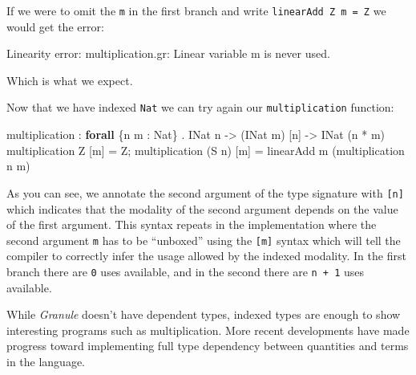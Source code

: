 \documentclass[
]{article}
\newenvironment{Shaded}{}{}
\newcommand{\DataTypeTok}[1]{\textcolor[rgb]{0.56,0.13,0.00}{#1}}
\newcommand{\FunctionTok}[1]{\textcolor[rgb]{0.02,0.16,0.49}{#1}}
\newcommand{\KeywordTok}[1]{\textcolor[rgb]{0.00,0.44,0.13}{\textbf{#1}}}
\newcommand{\NormalTok}[1]{#1}
\newcommand{\OperatorTok}[1]{\textcolor[rgb]{0.40,0.40,0.40}{#1}}
\newcommand{\OtherTok}[1]{\textcolor[rgb]{0.00,0.44,0.13}{#1}}
\begin{document}
If we were to omit the \texttt{m} in the first branch and write
\texttt{linearAdd\ Z\ m\ =\ Z} we would get the error:

\begin{Shaded}
\begin{Highlighting}[]
\DataTypeTok{Linearity} \FunctionTok{error}\OperatorTok{:}\NormalTok{ multiplication}\OperatorTok{.}\NormalTok{gr}\OperatorTok{:}
\DataTypeTok{Linear}\NormalTok{ variable }\OtherTok{\textasciigrave{}m\textasciigrave{}}\NormalTok{ is never used}\OperatorTok{.}
\end{Highlighting}
\end{Shaded}

Which is what we expect.

Now that we have indexed \texttt{Nat} we can try again our
\texttt{multiplication} function:

\begin{Shaded}
\begin{Highlighting}[]
\NormalTok{multiplication }\OperatorTok{:} \KeywordTok{forall}\NormalTok{ \{n m }\OperatorTok{:} \DataTypeTok{Nat}\NormalTok{\} }\OperatorTok{.} \DataTypeTok{INat}\NormalTok{ n }\OtherTok{{-}\textgreater{}}\NormalTok{ (}\DataTypeTok{INat}\NormalTok{ m) [n] }\OtherTok{{-}\textgreater{}} \DataTypeTok{INat}\NormalTok{ (n }\OperatorTok{*}\NormalTok{ m)}
\NormalTok{multiplication }\DataTypeTok{Z}\NormalTok{ [m] }\OtherTok{=} \DataTypeTok{Z}\NormalTok{;}
\NormalTok{multiplication (}\DataTypeTok{S}\NormalTok{ n) [m] }\OtherTok{=}\NormalTok{ linearAdd m (multiplication n m)}
\end{Highlighting}
\end{Shaded}

As you can see, we annotate the second argument of the type signature
with \texttt{{[}n{]}} which indicates that the modality of the second
argument depends on the value of the first argument. This syntax repeats
in the implementation where the second argument \texttt{m} has to be
``unboxed'' using the \texttt{{[}m{]}} syntax which will tell the
compiler to correctly infer the usage allowed by the indexed modality.
In the first branch there are \texttt{0} uses available, and in the
second there are \texttt{n\ +\ 1} uses available.

While \emph{Granule} doesn't have dependent types, indexed types are
enough to show interesting programs such as multiplication. More recent
developments have made progress toward implementing full type dependency
between quantities and terms in the language.
\end{document}
